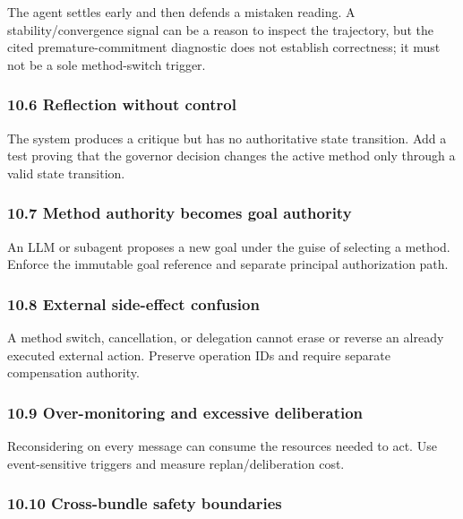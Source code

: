 The agent settles early and then defends a mistaken reading. A stability/convergence signal can be a reason to inspect the trajectory, but the cited premature-commitment diagnostic does not establish correctness; it must not be a sole method-switch trigger.

\subsubsection{10.6 Reflection without control}\label{reflection-without-control}

The system produces a critique but has no authoritative state transition. Add a test proving that the governor decision changes the active method only through a valid state transition.

\subsubsection{10.7 Method authority becomes goal authority}\label{method-authority-becomes-goal-authority}

An LLM or subagent proposes a new goal under the guise of selecting a method. Enforce the immutable goal reference and separate principal authorization path.

\subsubsection{10.8 External side-effect confusion}\label{external-side-effect-confusion}

A method switch, cancellation, or delegation cannot erase or reverse an already executed external action. Preserve operation IDs and require separate compensation authority.

\subsubsection{10.9 Over-monitoring and excessive deliberation}\label{over-monitoring-and-excessive-deliberation}

Reconsidering on every message can consume the resources needed to act. Use event-sensitive triggers and measure replan/deliberation cost.

\subsubsection{10.10 Cross-bundle safety boundaries}\label{cross-bundle-safety-boundaries}

